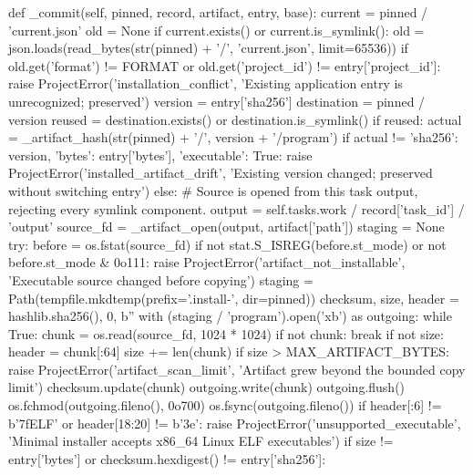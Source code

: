     def _commit(self, pinned, record, artifact, entry, base):
        current = pinned / 'current.json'
        old = None
        if current.exists() or current.is_symlink():
            old = json.loads(read_bytes(str(pinned) + '/', 'current.json', limit=65536))
            if old.get('format') != FORMAT or old.get('project_id') != entry['project_id']:
                raise ProjectError('installation_conflict', 'Existing application entry is unrecognized; preserved')
        version = entry['sha256']
        destination = pinned / version
        reused = destination.exists() or destination.is_symlink()
        if reused:
            actual = _artifact_hash(str(pinned) + '/', version + '/program')
            if actual != {'sha256': version, 'bytes': entry['bytes'], 'executable': True}:
                raise ProjectError('installed_artifact_drift', 'Existing version changed; preserved without switching entry')
        else:
            # Source is opened from this task output, rejecting every symlink component.
            output = self.tasks.work / record['task_id'] / 'output'
            source_fd = _artifact_open(output, artifact['path'])
            staging = None
            try:
                before = os.fstat(source_fd)
                if not stat.S_ISREG(before.st_mode) or not before.st_mode & 0o111:
                    raise ProjectError('artifact_not_installable', 'Executable source changed before copying')
                staging = Path(tempfile.mkdtemp(prefix='.install-', dir=pinned))
                checksum, size, header = hashlib.sha256(), 0, b''
                with (staging / 'program').open('xb') as outgoing:
                    while True:
                        chunk = os.read(source_fd, 1024 * 1024)
                        if not chunk:
                            break
                        if not size:
                            header = chunk[:64]
                        size += len(chunk)
                        if size > MAX_ARTIFACT_BYTES:
                            raise ProjectError('artifact_scan_limit', 'Artifact grew beyond the bounded copy limit')
                        checksum.update(chunk)
                        outgoing.write(chunk)
                    outgoing.flush()
                    os.fchmod(outgoing.fileno(), 0o700)
                    os.fsync(outgoing.fileno())
                if header[:6] != b'\x7fELF' or header[18:20] != b'\x3e':
                    raise ProjectError('unsupported_executable', 'Minimal installer accepts x86_64 Linux ELF executables')
                if size != entry['bytes'] or checksum.hexdigest() != entry['sha256']:
